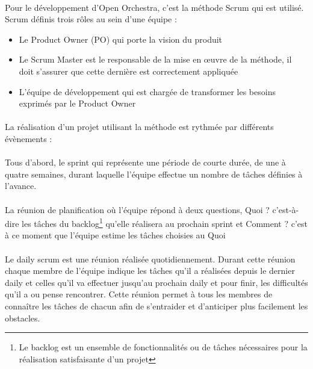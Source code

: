 \paragraph{}
Pour le développement d'Open Orchestra, c'est la méthode Scrum qui est utilisé. Scrum définis trois rôles au sein d'une équipe : 
\begin{itemize}
\item  Le \og Product Owner (PO) \fg{} qui porte la vision du produit
\item Le \og Scrum Master \fg{} est le responsable de la mise en œuvre de la méthode, il doit s'assurer que cette dernière est correctement appliquée
\item L'équipe de développement qui est chargée de transformer les besoins exprimés par le Product Owner
\end{itemize}
\paragraph{}
La réalisation d'un projet utilisant la méthode est rythmée par différents évènements : 
\paragraph{}
Tous d'abord, le sprint qui représente une période de courte durée, de une à quatre semaines, durant laquelle l'équipe effectue un nombre de tâches définies à l'avance.
 \paragraph{}
 La réunion de planification où l'équipe répond à deux questions, \og Quoi ? \fg{} c'est-à-dire les tâches du backlog\footnote{Le backlog est un ensemble de fonctionnalités ou de tâches nécessaires pour la réalisation satisfaisante d'un projet} qu'elle réalisera au prochain sprint et \og Comment ? \fg{} c'est à ce moment que l'équipe estime les tâches choisies au \og Quoi \fg{} 

 \paragraph{}
Le \og daily scrum \fg{} est une réunion réalisée quotidiennement. Durant cette réunion chaque membre de l'équipe indique les tâches qu'il a réalisées depuis le dernier daily et celles qu'il va effectuer jusqu'au prochain daily et pour finir, les difficultés qu'il a ou pense rencontrer.
Cette réunion permet à tous les membres de connaître les tâches de chacun afin de s'entraider et d'anticiper plus facilement les obstacles.
